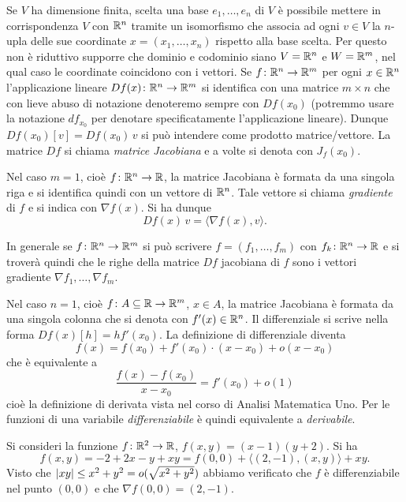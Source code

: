Se $V$ ha dimensione finita, scelta una base $e_1,\dots, e_n$ di $V$ 
è possibile mettere in corrispondenza $V$ con ${\mathbb R}^n$ tramite 
un isomorfismo che associa ad ogni $v\in V$ la $n$-upla delle sue coordinate $x=(x_1,\dots,x_n)$ 
rispetto alla base scelta.
Per questo non è riduttivo supporre che dominio e codominio siano
$V={\mathbb R}^n$ e $W={\mathbb R}^m$, nel qual caso le coordinate coincidono con i vettori.
Se $f\colon {\mathbb R}^n \to {\mathbb R}^m$ per ogni $x\in {\mathbb R}^n$ l'applicazione lineare 
$Df(x)\colon {\mathbb R}^n \to {\mathbb R}^m$ 
si identifica con una matrice $m\times n$
che con lieve abuso di notazione denoteremo sempre con $Df(x_0)$
(potremmo usare la notazione $df_{x_0}$ per denotare specificatamente 
l'applicazione lineare).
Dunque $Df(x_0)[v] = Df(x_0)\, v$ si può intendere come prodotto matrice/vettore.
La matrice $Df$ si chiama \emph{matrice Jacobiana} 
e a volte si denota con $J_f( x_0)$.

Nel caso $m=1$, cioè $f\colon {\mathbb R}^n \to {\mathbb R}$, la matrice Jacobiana
è formata da una singola riga e si identifica quindi con un 
vettore di ${\mathbb R}^n$. 
Tale vettore si chiama \emph{gradiente} di $f$ e si indica con 
$\nabla f(x)$. 
Si ha dunque
\[
  Df(x)\, v = \langle \nabla f(x), v\rangle.
\]

In generale se $f\colon {\mathbb R}^n \to {\mathbb R}^m$ 
si può scrivere $f = (f_1,\dots,f_m)$ con $f_k\colon {\mathbb R}^n \to {\mathbb R}$
e si troverà quindi che le righe della matrice $Df$ jacobiana di $f$
sono i vettori gradiente $\nabla f_1, \dots, \nabla f_m$.

Nel caso $n=1$, cioè $ f\colon A\subseteq {\mathbb R}\to{\mathbb R}^m$, $x\in A$,
la matrice Jacobiana è formata da una singola colonna che si denota con
$f'(x) \in {\mathbb R}^n$.
Il differenziale si scrive nella forma $Df(x)[h] = h f'(x_0)$.
La definizione di differenziale diventa
\[
  f(x) =  f(x_0) +  f'(x_0)\cdot (x-x_0) + o(x-x_0)
\] 
che è equivalente a 
\[
  \frac{ f(x) -  f(x_0)}{x-x_0} =  f'(x_0) + o(1)
\]
cioè la definizione di derivata vista nel corso di Analisi Matematica Uno.
Per le funzioni di una variabile \emph{differenziabile} è quindi equivalente 
a \emph{derivabile}.

\begin{example}\label{ex:48993}
  Si consideri la funzione $f\colon {\mathbb R}^2\to {\mathbb R}$, $f(x,y)=(x-1)(y+2)$.
  Si ha 
  \[
  f(x,y) = -2 + 2x - y + xy
   = f(0,0) + \langle(2,-1),(x,y)\rangle + xy.
  \]
  Visto che ${\left|xy\right|} \le x^2+y^2 = o(\sqrt{x^2+y^2})$
  abbiamo verificato che $f$ è differenziabile nel punto $(0,0)$ 
  e che $\nabla f(0,0) = (2,-1)$.
\end{example}

